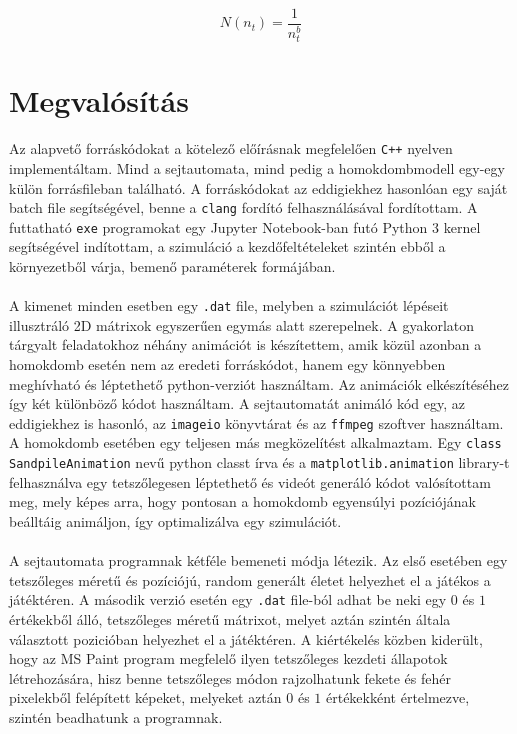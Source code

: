 \begin{multicols}{2}
\begin{equation}
    N \left( n_{t} \right)
    =
    \frac{1}{n_{t}^{b}}
\end{equation}

\section{Megvalósítás} \label{sec:3}
Az alapvető forráskódokat a kötelező előírásnak megfelelően \texttt{C++} nyelven implementáltam. Mind a sejtautomata, mind pedig a homokdombmodell egy-egy külön forrásfileban található. A forráskódokat az eddigiekhez hasonlóan egy saját batch file segítségével, benne a \texttt{clang} fordító felhasználásával fordítottam. A futtatható \texttt{exe} programokat egy Jupyter Notebook-ban futó Python 3 kernel segítségével indítottam, a szimuláció a kezdőfeltételeket szintén ebből a környezetből várja, bemenő paraméterek formájában.
\\ \\
A kimenet minden esetben egy \texttt{.dat} file, melyben a szimulációt lépéseit illusztráló 2D mátrixok egyszerűen egymás alatt szerepelnek. A gyakorlaton tárgyalt feladatokhoz néhány animációt is készítettem, amik közül azonban a homokdomb esetén nem az eredeti forráskódot, hanem egy könnyebben meghívható és léptethető python-verziót használtam. Az animációk elkészítéséhez így két különböző kódot használtam. A sejtautomatát animáló kód egy, az eddigiekhez is hasonló, az \texttt{imageio} könyvtárat és az \texttt{ffmpeg} szoftver használtam. A homokdomb esetében egy teljesen más megközelítést alkalmaztam. Egy \texttt{class SandpileAnimation} nevű python classt írva és a \texttt{matplotlib.animation} library-t felhasználva egy tetszőlegesen léptethető és videót generáló kódot valósítottam meg, mely képes arra, hogy pontosan a homokdomb egyensúlyi pozíciójának beálltáig animáljon, így optimalizálva egy szimulációt.
\\ \\
A sejtautomata programnak kétféle bemeneti módja létezik. Az első esetében egy tetszőleges méretű és pozíciójú, random generált életet helyezhet el a játékos a játéktéren. A második verzió esetén egy \texttt{.dat} file-ból adhat be neki egy $0$ és $1$ értékekből álló, tetszőleges méretű mátrixot, melyet aztán szintén általa választott pozicióban helyezhet el a játéktéren. A kiértékelés közben kiderült, hogy az MS Paint program megfelelő ilyen tetszőleges kezdeti állapotok létrehozására, hisz benne tetszőleges módon rajzolhatunk fekete és fehér pixelekből felépített képeket, melyeket aztán $0$ és $1$ értékekként értelmezve, szintén beadhatunk a programnak.

\end{multicols}
